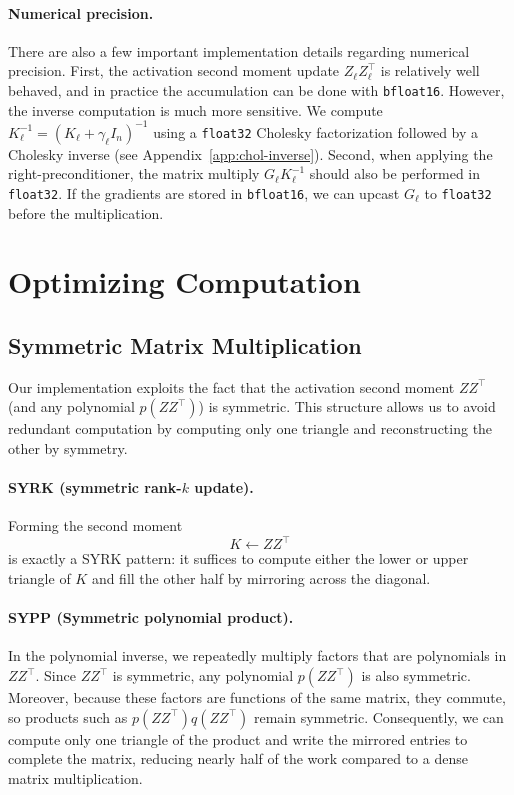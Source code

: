 \documentclass[11pt]{article}
\begin{document}
\paragraph{Numerical precision.}
There are also a few important implementation details regarding numerical precision. First, the activation second moment update
${Z}_\ell{Z}_\ell^\top$ is relatively well behaved, and in practice the accumulation can be done with \texttt{bfloat16}. However, the inverse computation is much more sensitive. We compute 
${K}_\ell^{-1}=({K}_\ell+\gamma_\ell{I}_n)^{-1}$ using a \texttt{float32} Cholesky factorization followed by a Cholesky inverse (see Appendix~\ref{app:chol-inverse}). 
Second, when applying the right-preconditioner, the matrix multiply ${G}_\ell {K}_\ell^{-1}$ should also be performed in
\texttt{float32}. If the gradients are stored in \texttt{bfloat16}, we can upcast ${G}_\ell$ to \texttt{float32} before the multiplication.


\section{Optimizing Computation}
\label{app:opt-compute}

\subsection{Symmetric Matrix Multiplication}
\label{app:symm}

Our implementation exploits the fact that the activation second moment
\({Z}{Z}^\top\) (and any polynomial \(p({Z}{Z}^\top)\)) is symmetric. This
structure allows us to avoid redundant computation by computing only one triangle and reconstructing the other by
symmetry.

\paragraph{SYRK (symmetric rank-\(k\) update).}
Forming the second moment
\[
{K}  \gets  {Z}{Z}^\top
\]
is exactly a SYRK pattern: it suffices to compute either the lower or upper triangle of \({K}\) and fill the
other half by mirroring across the diagonal.

\paragraph{SYPP (Symmetric polynomial product).}
In the polynomial inverse, we repeatedly multiply factors that are polynomials in \({Z}{Z}^\top\).
Since \({Z}{Z}^\top\) is symmetric, any polynomial \(p({Z}{Z}^\top)\) is also
symmetric. Moreover, because these factors are functions of the same matrix, they commute, so products such as
\(p({Z}{Z}^\top) q({Z}{Z}^\top)\) remain symmetric. Consequently, we can compute
only one triangle of the product and write the mirrored entries to complete the matrix, reducing nearly half of the work
compared to a dense matrix multiplication.
\end{document}
